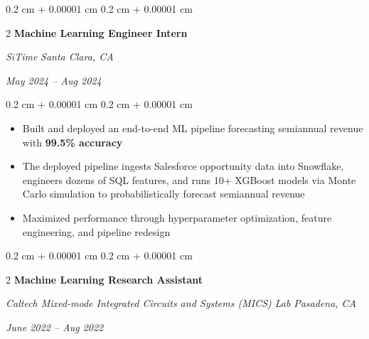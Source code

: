 \documentclass[10pt, letterpaper]{article}
\newenvironment{highlights}{ \begin{itemize}[ topsep=0.10 cm, parsep=0.10 cm, partopsep=0pt,
itemsep=0pt, leftmargin=0.4 cm + 10pt ] }{ \end{itemize} } %
\newenvironment{onecolentry}{ \begin{adjustwidth}{ 0.2 cm + 0.00001 cm }{ 0.2 cm + 0.00001 cm }
}{ \end{adjustwidth} } %
\newenvironment{twocolentry}[2][]{ \onecolentry \def\secondColumn{#2} \setcolumnwidth{\fill, 4.5 cm}
\begin{paracol}{2} }{ \switchcolumn \raggedleft \secondColumn \end{paracol}
\endonecolentry } %
\begin{document}
	\vspace{0.10 cm}

	\begin{twocolentry}
		{ \textit{Santa Clara, CA}

		\textit{May 2024 – Aug 2024}} \textbf{Machine Learning Engineer Intern}

		\textit{SiTime}
	\end{twocolentry}

	\vspace{0.10 cm}
	\begin{onecolentry}
		\begin{highlights}
			\item Built and deployed an end-to-end ML pipeline forecasting semiannual revenue with \textbf{99.5\% accuracy} \item The deployed pipeline ingests
			Salesforce opportunity data into Snowflake, engineers dozens of SQL features, and runs 10+ XGBoost models via Monte Carlo simulation to probabilistically forecast semiannual revenue \item Maximized performance through hyperparameter
			optimization, feature engineering, and pipeline redesign
		\end{highlights}
	\end{onecolentry}

	\vspace{0.10 cm}

%
%
%
%

	\begin{twocolentry}
		{ \textit{Pasadena, CA}

		\textit{June 2022 – Aug 2022}} \textbf{Machine Learning Research Assistant}

		\textit{Caltech Mixed-mode Integrated Circuits and Systems (MICS) Lab}
	\end{twocolentry}
\end{document}
